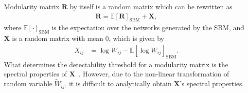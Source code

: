 \documentclass[12pt]{article} %
\def\mat#1{\mathbf{#1}}
\def\Exp{{\mathbb E}}
\begin{document}
Modularity matrix $\mat{R}$ by itself is a random matrix which can be rewritten as
\begin{align}
    \label{eq:modularity_2}
    \mat{R} =  \Exp\left[ \mat{R} \right]_{\text{SBM}} + \mat{X},
\end{align}
where $\Exp\left[ \cdot \right]_{\text{SBM}}$ is the expectation over the networks generated by the SBM, and $\mat{X}$ is a random matrix with mean $0$, which is given by
\begin{align}
    X_{ij} & = \log{\tilde W_{ij}} - \Exp\left[ \log \tilde W_{ij}  \right]_{\text{SBM}} \label{eq:Xij}.
\end{align}
What determines the detectability threshold for a modularity matrix is the spectral properties of $\mat{X}$~\cite{Nadakuditi2012}.
However, due to the non-linear transformation of random variable $\tilde W_{ij}$, it is difficult to analytically obtain $\mat{X}$'s spectral properties.
\end{document}
